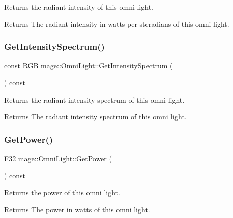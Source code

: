 Returns the radiant intensity of this omni light.

\begin{DoxyReturn}{Returns}
The radiant intensity in watts per steradians of this omni light. 
\end{DoxyReturn}
\hypertarget{classmage_1_1_omni_light_a89ce7086bd33e1d419dbd755316daf2e}{}\label{classmage_1_1_omni_light_a89ce7086bd33e1d419dbd755316daf2e} 
\subsubsection{\texorpdfstring{Get\+Intensity\+Spectrum()}{GetIntensitySpectrum()}}
{\footnotesize\ttfamily const \hyperlink{structmage_1_1_r_g_b}{R\+GB} mage\+::\+Omni\+Light\+::\+Get\+Intensity\+Spectrum (\begin{DoxyParamCaption}{ }\end{DoxyParamCaption}) const\hspace{0.3cm}{\ttfamily [noexcept]}}

Returns the radiant intensity spectrum of this omni light.

\begin{DoxyReturn}{Returns}
The radiant intensity spectrum of this omni light. 
\end{DoxyReturn}
\hypertarget{classmage_1_1_omni_light_a13f9893ef0a19cbb08bfce557bb906fc}{}\label{classmage_1_1_omni_light_a13f9893ef0a19cbb08bfce557bb906fc} 
\subsubsection{\texorpdfstring{Get\+Power()}{GetPower()}}
{\footnotesize\ttfamily \hyperlink{namespacemage_aa97e833b45f06d60a0a9c4fc22ae02c0}{F32} mage\+::\+Omni\+Light\+::\+Get\+Power (\begin{DoxyParamCaption}{ }\end{DoxyParamCaption}) const\hspace{0.3cm}{\ttfamily [noexcept]}}

Returns the power of this omni light.

\begin{DoxyReturn}{Returns}
The power in watts of this omni light. 
\end{DoxyReturn}
\hypertarget{classmage_1_1_omni_light_a17a0de3d22bfd3dcb2480f516009d885}{}\label{classmage_1_1_omni_light_a17a0de3d22bfd3dcb2480f516009d885} 
